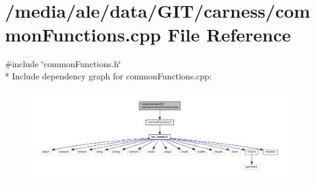 \hypertarget{a00027}{\section{/media/ale/data/\-G\-I\-T/carness/common\-Functions.cpp File Reference}
\label{a00027}
}
{\ttfamily \#include \char`\"{}common\-Functions.\-h\char`\"{}}\\*
Include dependency graph for common\-Functions.\-cpp\-:\nopagebreak
\begin{figure}[H]
\begin{center}
\leavevmode
\includegraphics[width=350pt]{a00055}
\end{center}
\end{figure}

